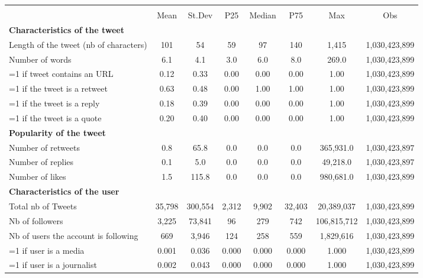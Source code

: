 {
\def\sym#1{\ifmmode^{#1}\else\(^{#1}\)\fi}
\begin{tabular}{l*{1}{ccccccc}}
\hline\hline
                    &\multicolumn{7}{c}{}                                                                      \\
                    &        Mean&      St.Dev&         P25&      Median&         P75&         Max&         Obs\\
\hline
\textbf{Characteristics of the tweet}&            &            &            &            &            &            &            \\
Length of the tweet (nb of characters)&         101&          54&          59&          97&         140&       1,415&1,030,423,899\\
Number of words     &         6.1&         4.1&         3.0&         6.0&         8.0&       269.0&1,030,423,899\\
=1 if tweet contains an URL&        0.12&        0.33&        0.00&        0.00&        0.00&        1.00&1,030,423,899\\
=1 if the tweet is a retweet&        0.63&        0.48&        0.00&        1.00&        1.00&        1.00&1,030,423,899\\
=1 if the tweet is a reply&        0.18&        0.39&        0.00&        0.00&        0.00&        1.00&1,030,423,899\\
=1 if the tweet is a quote&        0.20&        0.40&        0.00&        0.00&        0.00&        1.00&1,030,423,899\\
\textbf{Popularity of the tweet}&            &            &            &            &            &            &            \\
Number of retweets  &         0.8&        65.8&         0.0&         0.0&         0.0&   365,931.0&1,030,423,897\\
Number of replies   &         0.1&         5.0&         0.0&         0.0&         0.0&    49,218.0&1,030,423,897\\
Number of likes     &         1.5&       115.8&         0.0&         0.0&         0.0&   980,681.0&1,030,423,899\\
\textbf{Characteristics of the user}&            &            &            &            &            &            &            \\
Total nb of Tweets  &      35,798&     300,554&       2,312&       9,902&      32,403&  20,389,037&1,030,423,899\\
Nb of followers     &       3,225&      73,841&          96&         279&         742& 106,815,712&1,030,423,899\\
Nb of users the account is following&         669&       3,946&         124&         258&         559&   1,829,616&1,030,423,899\\
=1 if user is a media&       0.001&       0.036&       0.000&       0.000&       0.000&       1.000&1,030,423,899\\
=1 if user is a journalist&       0.002&       0.043&       0.000&       0.000&       0.000&       1.000&1,030,423,899\\
\hline\hline
\end{tabular}
}
